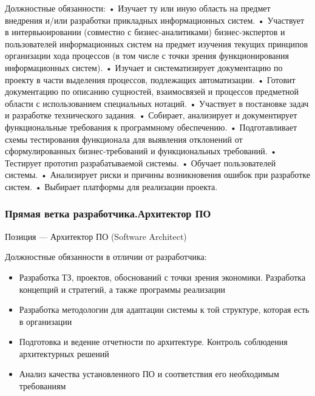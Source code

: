\documentclass{../industrial-development}
\begin{document}
Должностные обязанности:
•	Изучает ту или иную область на предмет внедрения и/или разработки прикладных информационных систем. 
•	Участвует в интервьюировании (совместно с бизнес-аналитиками) бизнес-экспертов и пользователей информационных систем на предмет изучения текущих принципов организации хода процессов (в том числе с точки зрения функционирования информационных систем). 
•	Изучает и систематизирует документацию по проекту в части выделения процессов, подлежащих автоматизации. 
•	Готовит документацию по описанию сущностей, взаимосвязей и процессов предметной области с использованием специальных нотаций. 
•	Участвует в постановке задач и разработке технического задания. 
•	Собирает, анализирует и документирует функциональные требования к программному обеспечению. 
•	Подготавливает схемы тестирования функционала для выявления отклонений от сформулированных бизнес-требований и функциональных требований. 
•	Тестирует прототип разрабатываемой системы. 
•	 Обучает пользователей системы. 
•	Анализирует риски и причины возникновения ошибок при разработке систем. 
•	Выбирает платформы для реализации проекта. 

\begin{frame} \frametitle{Прямая ветка разработчика.Архитектор ПО}
 \begin{block}{}
  \alert{Позиция --- Архитектор ПО (Software Architect)}

Должностные обязанности в отличии от разработчика: 
  \end{block}
  \begin{itemize}
\item  Разработка ТЗ, проектов, обоснований с точки зрения экономики. Разработка концепций и стратегий, а также программы реализации
  \item Разработка методологии для адаптации системы к той структуре, которая есть в организации
  \item Подготовка и ведение отчетности по архитектуре. Контроль соблюдения архитектурных решений
 \item Анализ качества установленного ПО и соответствия его необходимым требованиям
  \end{itemize}
\end{frame}
\end{document}
